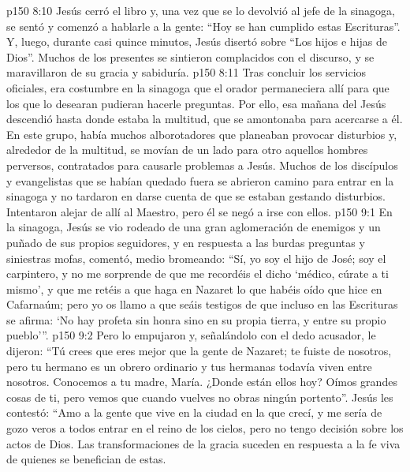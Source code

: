 \vs p150 8:10 Jesús cerró el libro y, una vez que se lo devolvió al jefe de la sinagoga, se sentó y comenzó a hablarle a la gente: “Hoy se han cumplido estas Escrituras”. Y, luego, durante casi quince minutos, Jesús disertó sobre “Los hijos e hijas de Dios”. Muchos de los presentes se sintieron complacidos con el discurso, y se maravillaron de su gracia y sabiduría.
\vs p150 8:11 Tras concluir los servicios oficiales, era costumbre en la sinagoga que el orador permaneciera allí para que los que lo desearan pudieran hacerle preguntas. Por ello, esa mañana del  Jesús descendió hasta donde estaba la multitud, que se amontonaba para acercarse a él. En este grupo, había muchos alborotadores que planeaban provocar disturbios y, alrededor de la multitud, se movían de un lado para otro aquellos hombres perversos, contratados para causarle problemas a Jesús. Muchos de los discípulos y evangelistas que se habían quedado fuera se abrieron camino para entrar en la sinagoga y no tardaron en darse cuenta de que se estaban gestando disturbios. Intentaron alejar de allí al Maestro, pero él se negó a irse con ellos.
\vs p150 9:1 En la sinagoga, Jesús se vio rodeado de una gran aglomeración de enemigos y un puñado de sus propios seguidores, y en respuesta a las burdas preguntas y siniestras mofas, comentó, medio bromeando: “Sí, yo soy el hijo de José; soy el carpintero, y no me sorprende de que me recordéis el dicho ‘médico, cúrate a ti mismo’, y que me retéis a que haga en Nazaret lo que habéis oído que hice en Cafarnaúm; pero yo os llamo a que seáis testigos de que incluso en las Escrituras se afirma: ‘No hay profeta sin honra sino en su propia tierra, y entre su propio pueblo’”.
\vs p150 9:2 Pero lo empujaron y, señalándolo con el dedo acusador, le dijeron: “Tú crees que eres mejor que la gente de Nazaret; te fuiste de nosotros, pero tu hermano es un obrero ordinario y tus hermanas todavía viven entre nosotros. Conocemos a tu madre, María. ¿Donde están ellos hoy? Oímos grandes cosas de ti, pero vemos que cuando vuelves no obras ningún portento”. Jesús les contestó: “Amo a la gente que vive en la ciudad en la que crecí, y me sería de gozo veros a todos entrar en el reino de los cielos, pero no tengo decisión sobre los actos de Dios. Las transformaciones de la gracia suceden en respuesta a la fe viva de quienes se benefician de estas.
